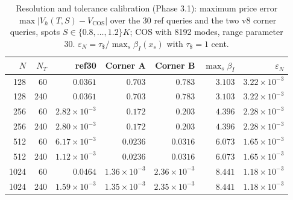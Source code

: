 \begin{table}[!htbp]
\centering\small
\caption{Resolution and tolerance calibration (Phase 3.1): maximum price error $\max|V_h(T,S)-V_{\mathrm{COS}}|$ over the 30 ref queries and the two v8 corner queries, spots $S\in\{0.8,\dots,1.2\}K$; COS with 8192 modes, range parameter 30. $\varepsilon_N=\tau_\$/\max_s\beta_I(x_s)$ with $\tau_\$=1$ cent.}
\label{tab:budget}
\begin{tabular}{rrrrrrr}
\toprule
$N$ & $N_T$ & ref30 & Corner A & Corner B & $\max_s\beta_I$ & $\varepsilon_N$\\
\midrule
128 & 60 & $0.0361$ & $0.703$ & $0.783$ & $3.103$ & $3.22\times10^{-3}$\\
128 & 240 & $0.0361$ & $0.703$ & $0.783$ & $3.103$ & $3.22\times10^{-3}$\\
256 & 60 & $2.82\times10^{-3}$ & $0.172$ & $0.203$ & $4.396$ & $2.28\times10^{-3}$\\
256 & 240 & $2.80\times10^{-3}$ & $0.172$ & $0.203$ & $4.396$ & $2.28\times10^{-3}$\\
512 & 60 & $6.17\times10^{-3}$ & $0.0236$ & $0.0316$ & $6.073$ & $1.65\times10^{-3}$\\
512 & 240 & $1.12\times10^{-3}$ & $0.0236$ & $0.0316$ & $6.073$ & $1.65\times10^{-3}$\\
1024 & 60 & $0.0464$ & $1.36\times10^{-3}$ & $2.36\times10^{-3}$ & $8.441$ & $1.18\times10^{-3}$\\
1024 & 240 & $1.59\times10^{-3}$ & $1.35\times10^{-3}$ & $2.35\times10^{-3}$ & $8.441$ & $1.18\times10^{-3}$\\
\bottomrule
\end{tabular}
\end{table}
